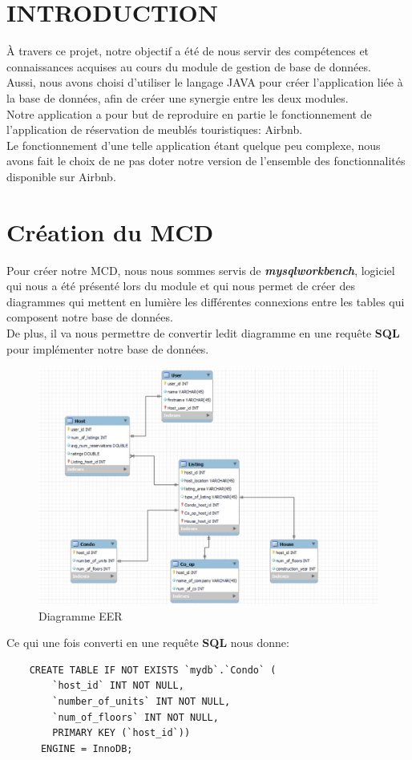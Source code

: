\documentclass{report}
\begin{document}
\listoffigures
\tableofcontents
\chapter{INTRODUCTION}
À travers ce projet, notre objectif a été de nous servir des compétences et connaissances acquises au cours du module de gestion de base de données.\\
Aussi, nous avons choisi d'utiliser le langage JAVA pour créer l'application liée à la base de données, afin de créer une synergie entre les deux modules.\\
Notre application a pour but de reproduire en partie le fonctionnement de l'application de réservation de meublés touristiques: Airbnb.\\
Le fonctionnement d'une telle application étant quelque peu complexe, nous avons fait le choix de ne pas doter notre version de l'ensemble des fonctionnalités disponible sur Airbnb.\\
\chapter{Création du MCD}
Pour créer notre MCD, nous nous sommes servis de \textbf{\emph{mysqlworkbench}}, logiciel qui nous a été présenté lors du module et qui nous permet de créer des diagrammes qui mettent en lumière les différentes connexions entre les tables qui composent notre base de données.\\
De plus, il va nous permettre de convertir ledit diagramme en une requête \textbf{SQL} pour implémenter notre base de données.
\begin{figure}[H] %
    \begin{center}
        \includegraphics[width=0.6\linewidth]{diagramme.png}
         \caption{Diagramme EER}
    \end{center}
\end{figure}
\newpage 
Ce qui une fois converti en une requête \textbf{SQL} nous donne:
\begin{lstlisting}
    CREATE TABLE IF NOT EXISTS `mydb`.`Condo` (
        `host_id` INT NOT NULL,
        `number_of_units` INT NOT NULL,
        `num_of_floors` INT NOT NULL,
        PRIMARY KEY (`host_id`))
      ENGINE = InnoDB;
    \end{lstlisting}
\end{document}
